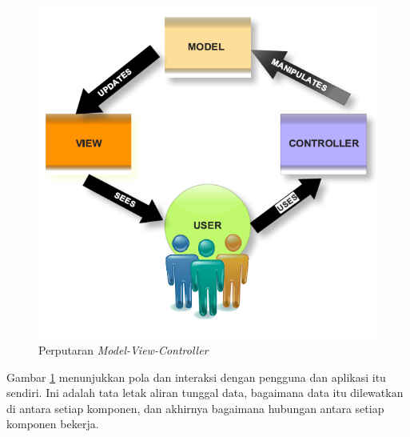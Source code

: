  \begin{figure}[h!]
     \centering
     \includegraphics[width=0.5\linewidth]{Gambar/MVC.PNG}
     \caption{Perputaran \textit{Model-View-Controller}}
     \label{fig:label}
 \end{figure}
Gambar \ref{fig:label} menunjukkan pola dan interaksi dengan pengguna dan aplikasi itu sendiri. Ini adalah tata letak aliran tunggal data, bagaimana data itu dilewatkan di antara setiap komponen, dan akhirnya bagaimana hubungan antara setiap komponen bekerja. 


